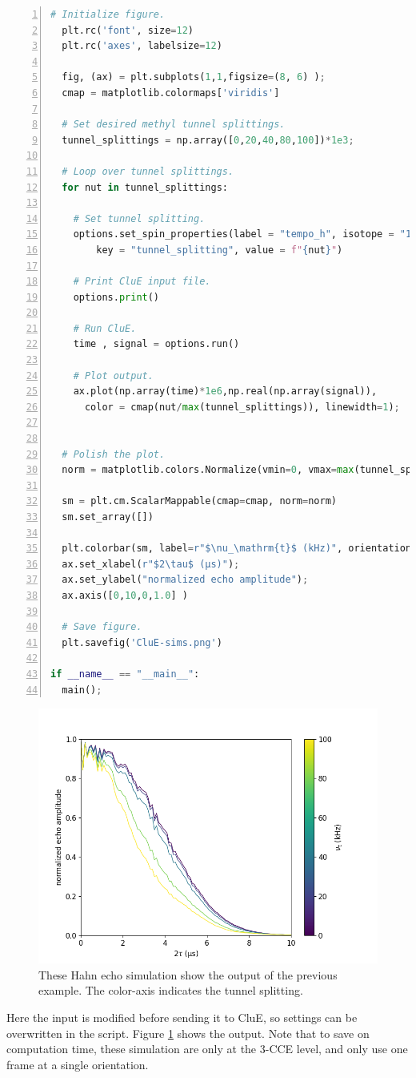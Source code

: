 \documentclass{book}
\begin{document}
\begin{lstlisting}[frame=single,numbers=left,language=python]
  # Initialize figure.
  plt.rc('font', size=12)
  plt.rc('axes', labelsize=12)

  fig, (ax) = plt.subplots(1,1,figsize=(8, 6) );
  cmap = matplotlib.colormaps['viridis']

  # Set desired methyl tunnel splittings. 
  tunnel_splittings = np.array([0,20,40,80,100])*1e3;

  # Loop over tunnel splittings.
  for nut in tunnel_splittings:

    # Set tunnel splitting.
    options.set_spin_properties(label = "tempo_h", isotope = "1H",
        key = "tunnel_splitting", value = f"{nut}")

    # Print CluE input file.
    options.print()
   
    # Run CluE.
    time , signal = options.run()

    # Plot output.
    ax.plot(np.array(time)*1e6,np.real(np.array(signal)),
      color = cmap(nut/max(tunnel_splittings)), linewidth=1);


  # Polish the plot.
  norm = matplotlib.colors.Normalize(vmin=0, vmax=max(tunnel_splittings)*1e-3)
  
  sm = plt.cm.ScalarMappable(cmap=cmap, norm=norm)
  sm.set_array([])

  plt.colorbar(sm, label=r"$\nu_\mathrm{t}$ (kHz)", orientation="vertical")  
  ax.set_xlabel(r"$2\tau$ (μs)");
  ax.set_ylabel("normalized echo amplitude");
  ax.axis([0,10,0,1.0] )

  # Save figure.
  plt.savefig('CluE-sims.png')

if __name__ == "__main__":
  main();
\end{lstlisting}
%
\begin{figure} [H]
	\centering
	\includegraphics[width=0.75\linewidth]{figs/fig_pyCluE-sims.png}
  \caption{These Hahn echo simulation show the output of the previous example.
  The color-axis indicates the tunnel splitting.
  }
  \label{fig:pyclue_out}
\end{figure}
%
Here the input is modified before sending it to CluE, 
so settings can be overwritten in the script.
Figure \ref{fig:pyclue_out} shows the output.  
Note that to save on computation time, these simulation are only at the 3-CCE 
level, and only use one frame at a single orientation.
\end{document}

